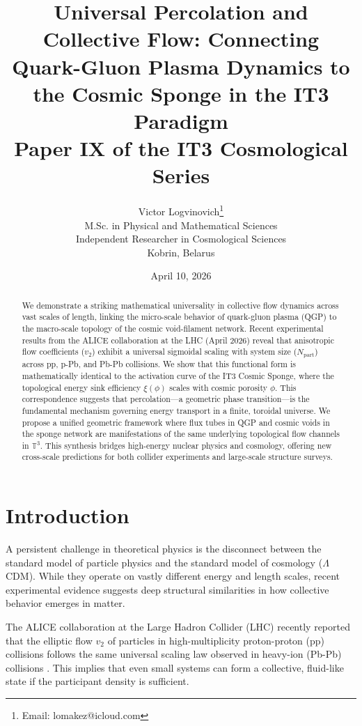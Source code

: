 \documentclass[12pt,a4paper]{article}
\title{\textbf{Universal Percolation and Collective Flow: Connecting Quark-Gluon Plasma Dynamics to the Cosmic Sponge in the IT3 Paradigm}\\[0.5cm]
\large Paper IX of the IT3 Cosmological Series}
\author{Victor Logvinovich\thanks{Email: lomakez@icloud.com}\\
M.Sc. in Physical and Mathematical Sciences\\
Independent Researcher in Cosmological Sciences\\
Kobrin, Belarus}
\date{April 10, 2026}
\begin{document}
\maketitle

\begin{abstract}
We demonstrate a striking mathematical universality in collective flow dynamics across vast scales of length, linking the micro-scale behavior of quark-gluon plasma (QGP) to the macro-scale topology of the cosmic void-filament network. Recent experimental results from the ALICE collaboration at the LHC (April 2026) reveal that anisotropic flow coefficients ($v_2$) exhibit a universal sigmoidal scaling with system size ($N_{\mathrm{part}}$) across pp, p-Pb, and Pb-Pb collisions. We show that this functional form is mathematically identical to the activation curve of the IT3 Cosmic Sponge, where the topological energy sink efficiency $\xi(\phi)$ scales with cosmic porosity $\phi$. This correspondence suggests that percolation—a geometric phase transition—is the fundamental mechanism governing energy transport in a finite, toroidal universe. We propose a unified geometric framework where flux tubes in QGP and cosmic voids in the sponge network are manifestations of the same underlying topological flow channels in $\mathbb{T}^3$. This synthesis bridges high-energy nuclear physics and cosmology, offering new cross-scale predictions for both collider experiments and large-scale structure surveys.
\end{abstract}

\section{Introduction}

A persistent challenge in theoretical physics is the disconnect between the standard model of particle physics and the standard model of cosmology ($\Lambda$CDM). While they operate on vastly different energy and length scales, recent experimental evidence suggests deep structural similarities in how collective behavior emerges in matter.

The ALICE collaboration at the Large Hadron Collider (LHC) recently reported that the elliptic flow $v_2$ of particles in high-multiplicity proton-proton (pp) collisions follows the same universal scaling law observed in heavy-ion (Pb-Pb) collisions \citep{ALICE2026}. This implies that even small systems can form a collective, fluid-like state if the participant density is sufficient.
\end{document}
